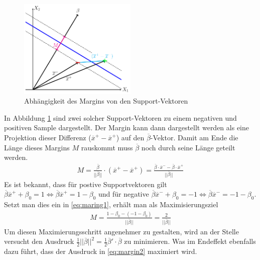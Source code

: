 \documentclass[
]{article}
\begin{document}
\begin{figure}[htb]
\centering
 \includegraphics[width=0.5\textwidth,trim=0.5cm 0.5cm 0.5cm 0.5cm]{Images/margin.pdf} 
        \caption{Abhängigkeit des Margins von den Support-Vektoren}
        \label{fig:SupVecs}
\end{figure}

In Abbildung \ref{fig:SupVecs} sind zwei solcher Support-Vektoren zu
einem negativen und positiven Sample dargestellt. Der Margin kann dann
dargestellt werden als eine Projektion dieser Differenz
(\(\overline{x}^+-\overline{x}^+\)) auf den \(\overline{\beta}\)-Vektor.
Damit am Ende die Länge dieses Margins \(M\) rauskommt muss
\(\overline{\beta}\) noch durch seine Länge geteilt werden.
\begin{align}
M=\frac{\overline{\beta}}{||\overline{\beta}||}\cdot \left(\overline{x}^+-\overline{x}^+\right)=\frac{\overline{\beta}\cdot\overline{x}^- -\overline{\beta}\cdot\overline{x}^+}{||\overline{\beta}||}\label{eq:maring1}
\end{align} Es ist bekannt, dass für postive Supportvektoren gilt
\(\overline\beta \overline{x}^+ +\beta_0 = 1 \Leftrightarrow \overline\beta \overline{x}^+=1-\beta_0\)
und für negative
\(\overline\beta \overline{x}^- +\beta_0 = -1 \Leftrightarrow \overline\beta \overline{x}^-=-1-\beta_0\).
Setzt man dies ein in \eqref{eq:maring1}, erhält man als
Maximisierungsziel \begin{align}
M=\frac{1-\beta_0-(-1-\beta_0)}{||\overline\beta||}=\frac{2}{||\overline\beta||}\label{eq:margin2}
\end{align} Um diesen Maximierungsschritt angenehmer zu gestalten, wird
an der Stelle versucht den Ausdruck
\(\frac{1}{2}||\overline \beta||^2=\frac{1}{2}\overline \beta '\cdot \overline \beta\)
zu minimieren. Was im Endeffekt ebenfalls dazu führt, dass der Ausdruck
in \eqref{eq:margin2} maximiert wird.
\end{document}
